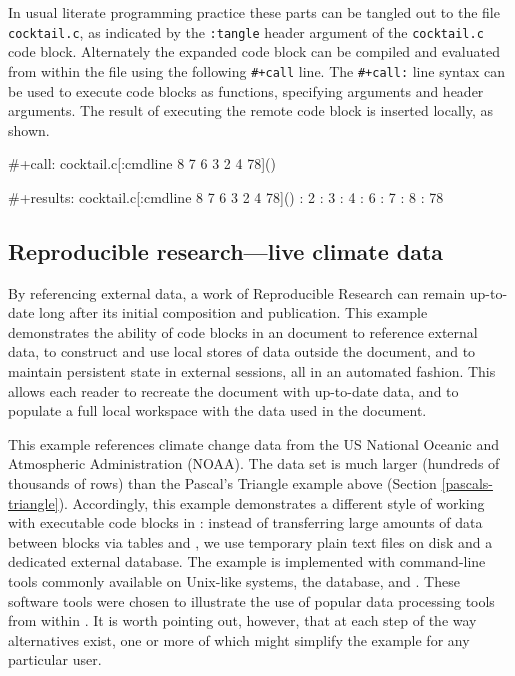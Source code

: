 \documentclass[article,shortnames]{jss}
\begin{document}
In usual literate programming practice these parts can be tangled out
to the file \texttt{cocktail.c}, as indicated by the \texttt{:tangle} header
argument of the \texttt{cocktail.c} code block.  Alternately the expanded
code block can be compiled and evaluated from within the  file
using the following \texttt{\#+call} line.  The \texttt{\#+call:} line syntax can be
used to execute code blocks as functions, specifying arguments and
header arguments.  The result of executing the remote code block is
inserted locally, as shown.


\begin{Code}
#+call: cocktail.c[:cmdline 8 7 6 3 2 4 78]()

#+results: cocktail.c[:cmdline 8 7 6 3 2 4 78]()
: 2
: 3
: 4
: 6
: 7
: 8
: 78
\end{Code}
\subsection{Reproducible research---live climate data}
\label{sec-4-3}

By referencing external data, a work of Reproducible Research can
remain up-to-date long after its initial composition and publication.
This example demonstrates the ability of code blocks in an 
document to reference external data, to construct and use local stores
of data outside the document, and to maintain persistent state in
external sessions, all in an automated fashion. This allows each
reader to recreate the document with up-to-date data, and to
populate a full local workspace with the data used in the document.

This example references climate change data from the US National
Oceanic and Atmospheric Administration (NOAA). The data set is much
larger (hundreds of thousands of rows) than the Pascal's Triangle
example above (Section \ref{pascals-triangle}). Accordingly, this
example demonstrates a different style of working with executable code
blocks in : instead of transferring large amounts of data
between blocks via  tables and , we use temporary
plain text files on disk and a dedicated external database. The
example is implemented with command-line tools commonly available on
Unix-like systems, the  database, and .  These software tools
were chosen to illustrate the use of popular data processing tools
from within .  It is worth pointing out, however, that at each
step of the way alternatives exist, one or more of which might
simplify the example for any particular user.
\end{document}
